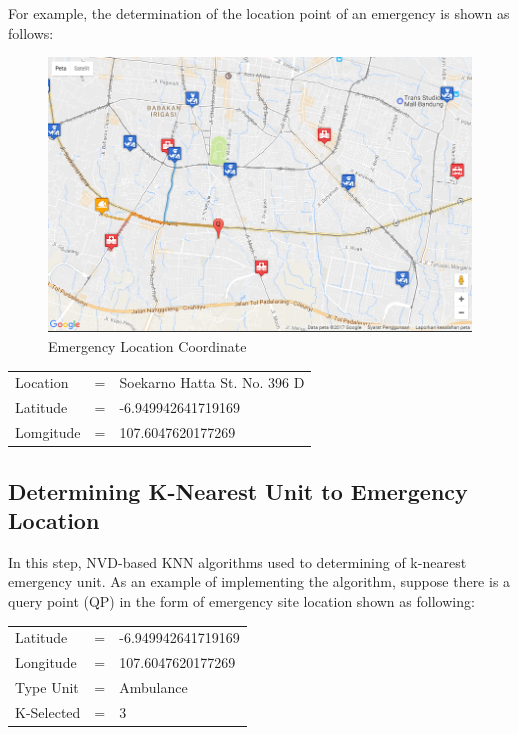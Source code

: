 \pagebreak
For example, the determination of the location point of an emergency is shown as follows:

\begin{figure}[H]
    \centering
    \includegraphics[scale=0.55]{data_proc_1.png}
    \caption{Emergency Location Coordinate}
    \label{fig:emergency_location_coordinate}
\end{figure}

\begin{table}[]
\centering
\begin{tabular}{lll}
Location  & = & Soekarno Hatta St. No. 396 D \\
Latitude  & = & -6.949942641719169           \\
Lomgitude & = & 107.6047620177269           
\end{tabular}
\end{table}


\subsection{Determining K-Nearest Unit to Emergency Location}
In this step, NVD-based KNN algorithms used to determining of k-nearest emergency unit. As an example of implementing the algorithm, suppose there is a query point (QP) in the form of emergency site location shown as following:

\begin{table}[H]
\centering
\begin{tabular}{lll}
Latitude   & = & -6.949942641719169 \\
Longitude  & = & 107.6047620177269  \\
Type Unit  & = & Ambulance          \\
K-Selected & = & 3                 
\end{tabular}
\end{table}

